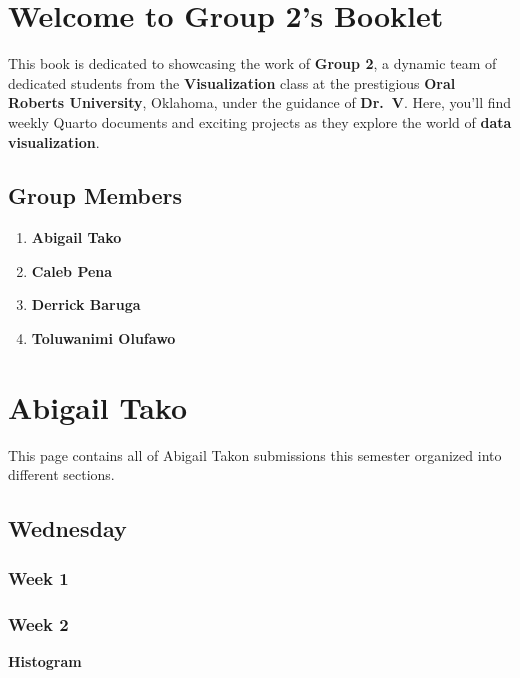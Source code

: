 \documentclass[
  letterpaper,
  DIV=11,
  numbers=noendperiod]{scrreprt}
\providecommand{\tightlist}{%
  \setlength{\itemsep}{0pt}\setlength{\parskip}{0pt}}\usepackage{longtable,booktabs,array}
\begin{document}
\chapter{Welcome to Group 2's
Booklet}\label{welcome-to-group-2s-booklet}

This book is dedicated to showcasing the work of \textbf{Group 2}, a
dynamic team of dedicated students from the \textbf{Visualization} class
at the prestigious \textbf{Oral Roberts University}, Oklahoma, under the
guidance of \textbf{Dr.~V}. Here, you'll find weekly Quarto documents
and exciting projects as they explore the world of \textbf{data
visualization}.

\section{Group Members}\label{group-members}

\begin{enumerate}
\def\labelenumi{\arabic{enumi}.}
\tightlist
\item
  \textbf{Abigail Tako}
\item
  \textbf{Caleb Pena}
\item
  \textbf{Derrick Baruga}
\item
  \textbf{Toluwanimi Olufawo}
\end{enumerate}


\chapter{Abigail Tako}\label{abigail-tako}

This page contains all of Abigail Takon submissions this semester
organized into different sections.

\section{Wednesday}\label{wednesday}

\subsection{Week 1}\label{week-1}

\subsection{Week 2}\label{week-2}

\textbf{Histogram}
\end{document}
